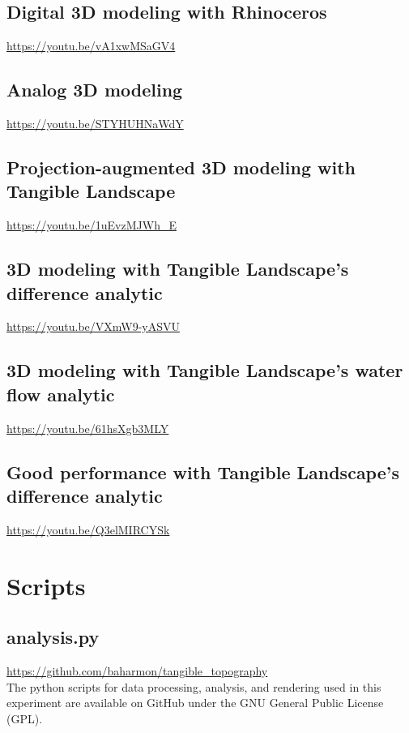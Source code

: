 \documentclass[prodmode,acmtochi]{acmsmall} %
\begin{document}
\subsection{Digital 3D modeling with Rhinoceros}\label{videos:digital}
\url{https://youtu.be/vA1xwMSaGV4}

\subsection{Analog 3D modeling}\label{videos:analog}
\url{https://youtu.be/STYHUHNaWdY}

\subsection{Projection-augmented 3D modeling with Tangible Landscape}\label{videos:augmented}
\url{https://youtu.be/1uEvzMJWh_E}

\subsection{3D modeling with Tangible Landscape's difference analytic}\label{videos:difference}
\url{https://youtu.be/VXmW9-yASVU}

\subsection{3D modeling with Tangible Landscape's water flow analytic}
\label{videos:water}
\url{https://youtu.be/61hsXgb3MLY}

\subsection{Good performance with Tangible Landscape's difference analytic}\label{videos:new_difference}
\url{https://youtu.be/Q3elMIRCYSk}



\section{Scripts}\label{appendix:scripts}

\subsection{analysis.py}
\url{https://github.com/baharmon/tangible_topography}\\

\noindent
The python scripts for data processing, analysis, and rendering 
used in this experiment 
are available on GitHub 
under the GNU General Public License (GPL). 
\end{document}
